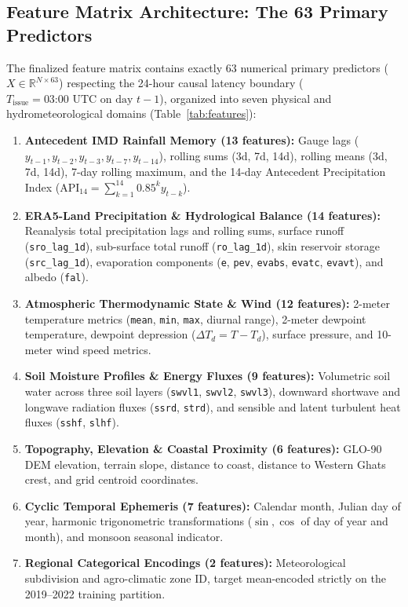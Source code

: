 \documentclass[12pt]{article}
\begin{document}
\subsection{Feature Matrix Architecture: The 63 Primary Predictors}
The finalized feature matrix contains exactly 63 numerical primary predictors ($X \in \mathbb{R}^{N \times 63}$) respecting the 24-hour causal latency boundary ($T_{\text{issue}} = \text{03:00 UTC on day } t-1$), organized into seven physical and hydrometeorological domains (Table~\ref{tab:features}):
\begin{enumerate}
    \item \textbf{Antecedent IMD Rainfall Memory (13 features):} Gauge lags ($y_{t-1}, y_{t-2}, y_{t-3}, y_{t-7}, y_{t-14}$), rolling sums (3d, 7d, 14d), rolling means (3d, 7d, 14d), 7-day rolling maximum, and the 14-day Antecedent Precipitation Index ($\text{API}_{14} = \sum_{k=1}^{14} 0.85^k y_{t-k}$).
    \item \textbf{ERA5-Land Precipitation \& Hydrological Balance (14 features):} Reanalysis total precipitation lags and rolling sums, surface runoff (\texttt{sro\_lag\_1d}), sub-surface total runoff (\texttt{ro\_lag\_1d}), skin reservoir storage (\texttt{src\_lag\_1d}), evaporation components (\texttt{e}, \texttt{pev}, \texttt{evabs}, \texttt{evatc}, \texttt{evavt}), and albedo (\texttt{fal}).
    \item \textbf{Atmospheric Thermodynamic State \& Wind (12 features):} 2-meter temperature metrics (\texttt{mean}, \texttt{min}, \texttt{max}, diurnal range), 2-meter dewpoint temperature, dewpoint depression ($\Delta T_d = T - T_d$), surface pressure, and 10-meter wind speed metrics.
    \item \textbf{Soil Moisture Profiles \& Energy Fluxes (9 features):} Volumetric soil water across three soil layers (\texttt{swvl1}, \texttt{swvl2}, \texttt{swvl3}), downward shortwave and longwave radiation fluxes (\texttt{ssrd}, \texttt{strd}), and sensible and latent turbulent heat fluxes (\texttt{sshf}, \texttt{slhf}).
    \item \textbf{Topography, Elevation \& Coastal Proximity (6 features):} GLO-90 DEM elevation, terrain slope, distance to coast, distance to Western Ghats crest, and grid centroid coordinates.
    \item \textbf{Cyclic Temporal Ephemeris (7 features):} Calendar month, Julian day of year, harmonic trigonometric transformations ($\sin, \cos$ of day of year and month), and monsoon seasonal indicator.
    \item \textbf{Regional Categorical Encodings (2 features):} Meteorological subdivision and agro-climatic zone ID, target mean-encoded strictly on the 2019--2022 training partition.
\end{enumerate}
\end{document}
